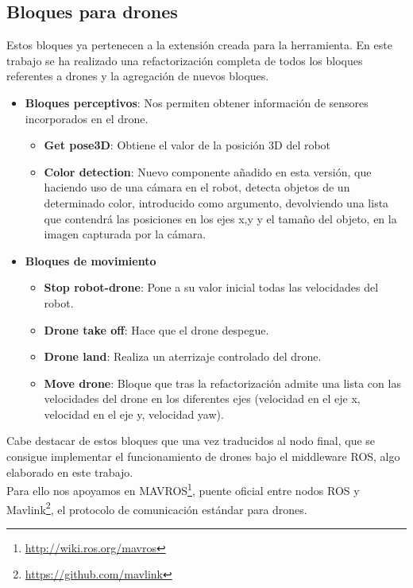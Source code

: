\subsection{Bloques para drones}
Estos bloques ya pertenecen a la extensión creada para la herramienta.
En este trabajo se ha realizado una refactorización completa de todos los bloques referentes a drones y la agregación de nuevos bloques. 
\begin{itemize}
\item \textbf{Bloques perceptivos}:
Nos permiten obtener información de sensores incorporados en el drone.
	\begin{itemize}
	\item \textbf{Get pose3D}: Obtiene el valor de la posición 3D del robot
	\item \textbf{Color detection}: Nuevo componente añadido en esta versión, que haciendo uso de una cámara en el robot, detecta objetos de un determinado color, introducido como argumento, devolviendo una lista que contendrá las posiciones en los ejes x,y y el tamaño del objeto, en la imagen capturada por la cámara. 
	\end{itemize}
\item \textbf{Bloques de movimiento}
	\begin{itemize}
	\item \textbf{Stop robot-drone}: Pone a su valor inicial todas las velocidades del robot.
	\item \textbf{Drone take off}: Hace que el drone despegue.
	\item \textbf{Drone land}: Realiza un aterrizaje controlado del drone.
	\item \textbf{Move drone}: Bloque que tras la refactorización admite una lista con las velocidades del drone en los diferentes ejes (velocidad en el eje x, velocidad en el eje y, velocidad yaw).
	\end{itemize}
\end{itemize}

Cabe destacar de estos bloques que una vez traducidos al nodo final, que se consigue implementar el funcionamiento de drones bajo el middleware ROS, algo elaborado en este trabajo.\\

Para ello nos apoyamos en MAVROS\footnote{\url{http://wiki.ros.org/mavros}}, puente oficial entre nodos ROS y Mavlink\footnote{\url{https://github.com/mavlink}}, el protocolo de comunicación estándar para drones.

